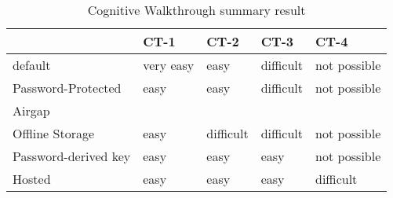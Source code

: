 
\begin{table*}[h]

\centering

\begin{tabular}{l|l|l|l|l|}
\cline{2-5}
                                           \ & CT-1      & CT-2      & CT-3      & CT-4         \\ \hline
\multicolumn{1}{|l|}{default}              & very easy & easy      & difficult & not possible \\ \hline
\multicolumn{1}{|l|}{Password-Protected}   & easy      & easy      & difficult & not possible \\ \hline
\multicolumn{1}{|l|}{Airgap}               &           &           &           &              \\ \hline
\multicolumn{1}{|l|}{Offline Storage}      & easy      & difficult & difficult & not possible \\ \hline
\multicolumn{1}{|l|}{Password-derived key} & easy      & easy      & easy      & not possible \\ \hline
\multicolumn{1}{|l|}{Hosted}               & easy      & easy      & easy      & difficult    \\ \hline
\end{tabular}

\caption{Cognitive Walkthrough summary result}
\label{tab:cogtable}

\end{table*}
  














